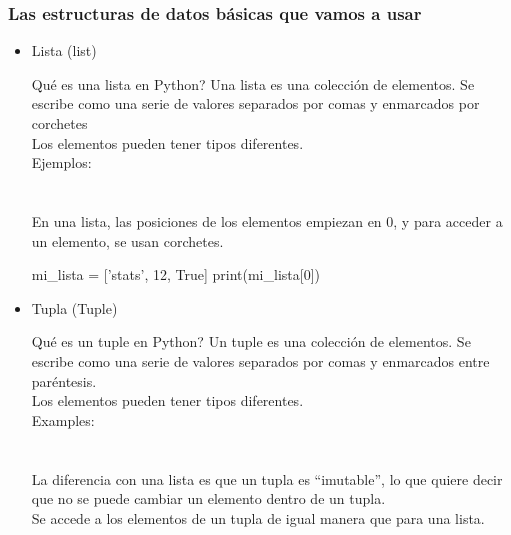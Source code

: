 \documentclass[handout,9pt]{beamer}
\begin{document}
\begin{frame}[fragile]
  \frametitle{Las estructuras de datos básicas que vamos a usar}
  \begin{itemize}
  \item Lista (list) \\ \pause
    {\scriptsize
      \begin{minipage}{0.9\textwidth}
        \begin{block}{Qué es una lista en Python?}
         Una lista es una colección de elementos. Se escribe como una
         serie de valores separados por comas y enmarcados por corchetes\\
          Los elementos pueden tener tipos diferentes.\\
          Ejemplos: \\
          \\
          \\
          En una lista, las posiciones de los elementos empiezan en 0,
          y para acceder a un elemento, se usan corchetes.
          \begin{pyconsole}
mi_lista = ['stats', 12, True]
print(mi_lista[0])
          \end{pyconsole}
        \end{block}
      \end{minipage}}\pause
  \item Tupla (Tuple) \\ \pause
    {\scriptsize
      \begin{minipage}{0.9\textwidth}
        \begin{block}{Qué es un tuple en Python?}
          Un tuple es una colección de elementos. Se escribe como una
          serie de valores separados por comas y enmarcados entre paréntesis.\\
          Los elementos pueden tener tipos diferentes.\\
          Examples:\\
          \\
          \\
          La diferencia con una lista es que un tupla es ``imutable'',
          lo que quiere decir que no se puede cambiar un elemento
          dentro de un tupla.\\
          Se accede a los elementos de un tupla de igual manera que
          para una lista.
        \end{block}
      \end{minipage}}
  \end{itemize}
\end{frame}
\end{document}
